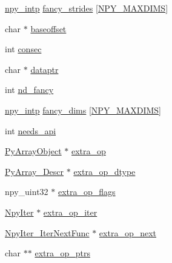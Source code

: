\begin{DoxyCompactItemize}
\item 
\hyperlink{npy__common_8h_a2d6effc4d5ecb85675ebfcfaa102b483}{npy\+\_\+intp} \hyperlink{structPyArrayMapIterObject_a0d3d37e356d6da3eca90a5996f03619c}{fancy\+\_\+strides} \mbox{[}\hyperlink{ndarraytypes_8h_a737679ea9ee902bfa707c146051c17b5}{N\+P\+Y\+\_\+\+M\+A\+X\+D\+I\+MS}\mbox{]}
\item 
char $\ast$ \hyperlink{structPyArrayMapIterObject_acff4c75f782ff923e26ef47f3dc393bc}{baseoffset}
\item 
int \hyperlink{structPyArrayMapIterObject_ad9e414072cf68e82187e2afa3b2a3e22}{consec}
\item 
char $\ast$ \hyperlink{structPyArrayMapIterObject_afb718043900f46c0df593399f7080edf}{dataptr}
\item 
int \hyperlink{structPyArrayMapIterObject_a6c2c88d6c0ced20d8fb88630c3b55518}{nd\+\_\+fancy}
\item 
\hyperlink{npy__common_8h_a2d6effc4d5ecb85675ebfcfaa102b483}{npy\+\_\+intp} \hyperlink{structPyArrayMapIterObject_abf267a3b8a4691402e42907769784c04}{fancy\+\_\+dims} \mbox{[}\hyperlink{ndarraytypes_8h_a737679ea9ee902bfa707c146051c17b5}{N\+P\+Y\+\_\+\+M\+A\+X\+D\+I\+MS}\mbox{]}
\item 
int \hyperlink{structPyArrayMapIterObject_a28d261c4c264ec6ea75417348d1b014e}{needs\+\_\+api}
\item 
\hyperlink{ndarraytypes_8h_af074aa0de75119b0769c7eff2bacf784}{Py\+Array\+Object} $\ast$ \hyperlink{structPyArrayMapIterObject_a60475bfcb94afee29f79be091e2a2098}{extra\+\_\+op}
\item 
\hyperlink{ndarraytypes_8h_a08fb2fb967ebbdd179e08d7b8756bd75}{Py\+Array\+\_\+\+Descr} $\ast$ \hyperlink{structPyArrayMapIterObject_aed4409ade01d291e67d702c62000b2b9}{extra\+\_\+op\+\_\+dtype}
\item 
npy\+\_\+uint32 $\ast$ \hyperlink{structPyArrayMapIterObject_acb62d402290f16e0649a05f9716604f8}{extra\+\_\+op\+\_\+flags}
\item 
\hyperlink{ndarraytypes_8h_a866c6cf138a4574401b7741d4238c413}{Npy\+Iter} $\ast$ \hyperlink{structPyArrayMapIterObject_ac67802ef7d69788ad147949d8a36e16f}{extra\+\_\+op\+\_\+iter}
\item 
\hyperlink{ndarraytypes_8h_ab1bb8a50158a22e324d2fd4a14d4153d}{Npy\+Iter\+\_\+\+Iter\+Next\+Func} $\ast$ \hyperlink{structPyArrayMapIterObject_a5a7f3057181225245f7f2f7a2ce54258}{extra\+\_\+op\+\_\+next}
\item 
char $\ast$$\ast$ \hyperlink{structPyArrayMapIterObject_a52f079f0a5c12ec0a21fcaac23648e2b}{extra\+\_\+op\+\_\+ptrs}
$$
\end{DoxyCompactItemize}
